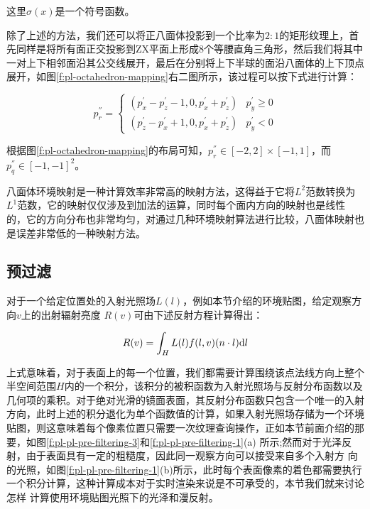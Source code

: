 这里$\sigma(x)$是一个符号函数。

除了上述的方法，我们还可以将正八面体投影到一个比率为$2:1$的矩形纹理上，首先同样是将所有面正交投影到ZX平面上形成8个等腰直角三角形，然后我们将其中一对上下相邻面沿其公交线展开，最后在分别将上下半球的面沿八面体的上下顶点展开，如图\ref{f:pl-octahedron-mapping}右二图所示，该过程可以按下式进行计算：

\begin{equation}
	p^{''}_r=\begin{cases}
		(p^{'}_x-p^{'}_z-1,0,p^{'}_x+p^{'}_z) & p^{'}_y\geq 0 \\
		(p^{'}_z-p^{'}_x+1,0,p^{'}_x+p^{'}_z) & p^{'}_y< 0
	\end{cases}
\end{equation}

根据图\ref{f:pl-octahedron-mapping}的布局可知，$p^{''}_r\in[-2,2]\times [-1,1]$，而$p^{''}_q\in [-1,-1]^{2}$。

八面体环境映射是一种计算效率非常高的映射方法，这得益于它将$L^{2}$范数转换为$L^{1}$范数，它的映射仅仅涉及到加法的运算，同时每个面内方向的映射也是线性的，它的方向分布也非常均匀，\cite{a:ASurveyofEfficientRepresentationsforIndependentUnitVectors}对通过几种环境映射算法进行比较，八面体映射也是误差非常低的一种映射方法。




\subsection{预过滤}
对于一个给定位置处的入射光照场$L(l)$，例如本节介绍的环境贴图，给定观察方向$v$上的出射辐射亮度 $R(v)$可由下述反射方程计算得出：

\begin{equation}\label{e:pl-prefiltering-1}
	R(v)=\int_H L(l)f(l,v)(n\cdot l){\rm d}l
\end{equation}

上式意味着，对于表面上的每一个位置，我们都需要计算围绕该点法线方向上整个半空间范围$H$内的一个积分，该积分的被积函数为入射光照场与反射分布函数以及几何项的乘积。对于绝对光滑的镜面表面，其反射分布函数只包含一个唯一的入射方向，此时上述的积分退化为单个函数值的计算，如果入射光照场存储为一个环境贴图，则这意味着每个像素位置只需要一次纹理查询操作，正如本节前面介绍的那要，如图\ref{f:pl-pl-pre-filtering-3}和\ref{f:pl-pl-pre-filtering-1}(a) 所示;然而对于光泽反射，由于表面具有一定的粗糙度，因此同一观察方向可以接受来自多个入射方 向的光照，如图\ref{f:pl-pl-pre-filtering-1}(b)所示，此时每个表面像素的着色都需要执行一个积分计算，这种计算成本对于实时渲染来说是不可承受的，本节我们就来讨论怎样 计算使用环境贴图光照下的光泽和漫反射。

